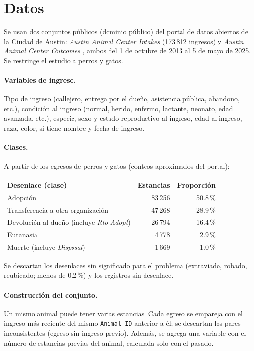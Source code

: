 \documentclass[11pt,letterpaper]{article}
\begin{document}
\section{Datos}
Se usan dos conjuntos públicos (dominio público) del portal de datos abiertos de la Ciudad de Austin:
\emph{Austin Animal Center Intakes} (173\,812 ingresos) \cite{austinintakes} y \emph{Austin Animal
Center Outcomes} \cite{austinoutcomes}, ambos del 1 de octubre de 2013 al 5 de mayo de 2025. Se
restringe el estudio a perros y gatos.

\paragraph{Variables de ingreso.} Tipo de ingreso (callejero, entrega por el dueño, asistencia
pública, abandono, etc.), condición al ingreso (normal, herido, enfermo, lactante, neonato, edad
avanzada, etc.), especie, sexo y estado reproductivo al ingreso, edad al ingreso, raza, color, si
tiene nombre y fecha de ingreso.

\paragraph{Clases.} A partir de los egresos de perros y gatos (conteos aproximados del portal):
\begin{table}[H]
\centering\small
\begin{tabular}{@{}lrr@{}}
\toprule
Desenlace (clase) & Estancias & Proporción \\ \midrule
Adopción & 83\,256 & 50.8\,\% \\
Transferencia a otra organización & 47\,268 & 28.9\,\% \\
Devolución al dueño (incluye \emph{Rto-Adopt}) & 26\,794 & 16.4\,\% \\
Eutanasia & 4\,778 & 2.9\,\% \\
Muerte (incluye \emph{Disposal}) & 1\,669 & 1.0\,\% \\
\bottomrule
\end{tabular}
\end{table}
\noindent Se descartan los desenlaces sin significado para el problema (extraviado, robado,
reubicado; menos de 0.2\,\%) y los registros sin desenlace.

\paragraph{Construcción del conjunto.} Un mismo animal puede tener varias estancias. Cada egreso se
empareja con el ingreso más reciente del mismo \texttt{Animal ID} anterior a él; se descartan los
pares inconsistentes (egreso sin ingreso previo). Además, se agrega una variable con el número de
estancias previas del animal, calculada solo con el pasado.
\end{document}

